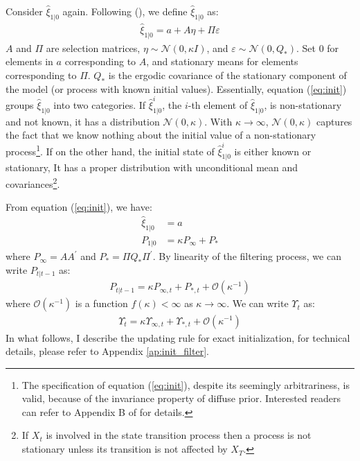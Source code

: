\documentclass[10pt]{article}
\numberwithin{equation}{section}
\begin{document}
Consider $\hat{\xi}_{1|0}$ again. Following (\cite{koopman_1997}), we define $\hat{\xi}_{1|0}$ as:
\begin{align}
    \hat{\xi}_{1|0} = a + A\eta + \Pi\varepsilon \label{eq:init}
\end{align}
$A$ and $\Pi$ are selection matrices, $\eta\sim\mathcal{N}(0,\kappa I)$, and $\varepsilon\sim\mathcal{N}(0,Q_{*})$. Set $0$ for elements in $a$ corresponding to $A$, and stationary means for elements corresponding to $\Pi$. $Q_{*}$ is the ergodic covariance of the stationary component of the model (or process with known initial values). Essentially, equation (\ref{eq:init}) groups $\hat{\xi}_{1|0}$ into two categories. If $\hat{\xi}_{1|0}^i$, the $i$-th element of $\hat{\xi}_{1|0}$, is non-stationary and not known, it has a distribution $\mathcal{N}(0, \kappa)$. With $\kappa\rightarrow\infty$, $\mathcal{N}(0,\kappa)$ captures the fact that we know nothing about the initial value of a non-stationary process\footnote{The specification of equation (\ref{eq:init}), despite its seemingly arbitrariness, is valid, because of the invariance property of diffuse prior. Interested readers can refer to Appendix B of \cite{doan_2010} for details.}. If on the other hand, the initial state of $\hat{\xi}_{1|0}^i$ is either known or stationary, It has a proper distribution with unconditional mean and covariances\footnote{If $X_t$ is involved in the state transition process then a process is not stationary unless its transition is not affected by $X_T$.}. 

From equation (\ref{eq:init}), we have:
\begin{align}
    \hat{\xi}_{1|0} &= a  \label{eq:init_xi}\\
    P_{1|0} &= \kappa P_{\infty} + P_{*} \label{eq:init_P}
\end{align}
where $P_{\infty}=AA^{'}$ and $P_{*}=\Pi Q_* \Pi^{'}$. By linearity of the filtering process, we can write $P_{t|t-1}$ as:
\begin{align}
    P_{t|t-1} = \kappa P_{\infty,t} + P_{*,t} + \mathcal{O}(\kappa^{-1}) \label{eq:P_diffuse}
\end{align}
where $\mathcal{O}(\kappa^{-1})$ is a function $f(\kappa)<\infty$ as $\kappa\rightarrow\infty$. We can write $\Upsilon_{t}$ as:
\begin{align*}
    \Upsilon_t = \kappa\Upsilon_{\infty,t} + \Upsilon_{*,t} + \mathcal{O}(\kappa^{-1})
\end{align*}
In what follows, I describe the updating rule for exact initialization, for technical details, please refer to Appendix \ref{ap:init_filter}.
\end{document}
